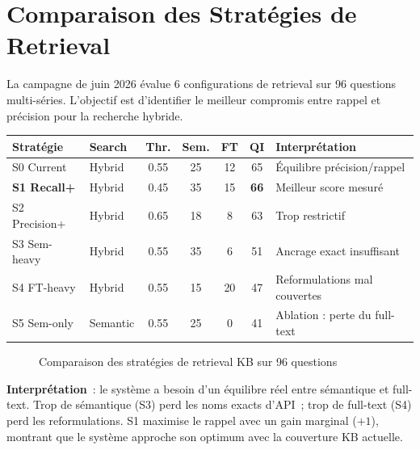 \section{Comparaison des Stratégies de Retrieval}
\label{sec:strategies_retrieval}

La campagne de juin 2026 évalue 6 configurations de retrieval sur 96 questions multi-séries. L'objectif est d'identifier le meilleur compromis entre rappel et précision pour la recherche hybride.

\begin{longtable}{p{2cm}p{2cm}ccccp{4cm}}
\toprule
\textbf{Stratégie} & \textbf{Search} & \textbf{Thr.} & \textbf{Sem.} & \textbf{FT} & \textbf{QI} & \textbf{Interprétation} \\
\midrule
S0 Current & Hybrid & 0.55 & 25 & 12 & 65 & Équilibre précision/rappel \\
\textbf{S1 Recall+} & Hybrid & 0.45 & 35 & 15 & \textbf{66} & Meilleur score mesuré \\
S2 Precision+ & Hybrid & 0.65 & 18 & 8 & 63 & Trop restrictif \\
S3 Sem-heavy & Hybrid & 0.55 & 35 & 6 & 51 & Ancrage exact insuffisant \\
S4 FT-heavy & Hybrid & 0.55 & 15 & 20 & 47 & Reformulations mal couvertes \\
S5 Sem-only & Semantic & 0.55 & 25 & 0 & 41 & Ablation : perte du full-text \\
\bottomrule
\end{longtable}

\begin{figure}[H]
\centering
{}
\caption{Comparaison des stratégies de retrieval KB sur 96 questions}
\label{fig:strategies_retrieval}
\end{figure}

\textbf{Interprétation}~: le système a besoin d'un équilibre réel entre sémantique et full-text. Trop de sémantique (S3) perd les noms exacts d'API~; trop de full-text (S4) perd les reformulations. S1 maximise le rappel avec un gain marginal ($+1$), montrant que le système approche son optimum avec la couverture KB actuelle.


